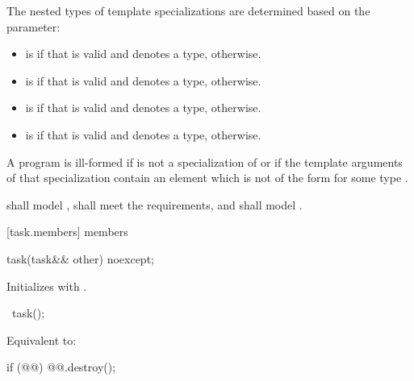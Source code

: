 \pnum
The nested types of  template specializations
are determined based on the  parameter:
\begin{itemize}
\item {} is 
if that  is valid and denotes a type,
 otherwise.
\item {} is 
if that  is valid and denotes a type,
 otherwise.
\item {} is 
if that  is valid and denotes a type,
 otherwise.
\item {} is  if
that  is valid and denotes a type,
 otherwise.
\end{itemize}

\pnum
 A program is ill-formed if  is not a
specialization of 
or if the template arguments of that specialization
contain an element which is not of the form
 for some type .

\pnum
{} shall model ,
 shall meet the  requirements, and
 shall model .

[task.members]{ members}

%
\begin{itemdecl}
task(task&& other) noexcept;
\end{itemdecl}
\begin{itemdescr}
\pnum
\effects
Initializes  with .
\end{itemdescr}

%
\begin{itemdecl}
~task();
\end{itemdecl}
\begin{itemdescr}
\pnum
\effects
Equivalent to:
\begin{codeblock}
if (@@)
  @@.destroy();
\end{codeblock}
\end{itemdescr}

